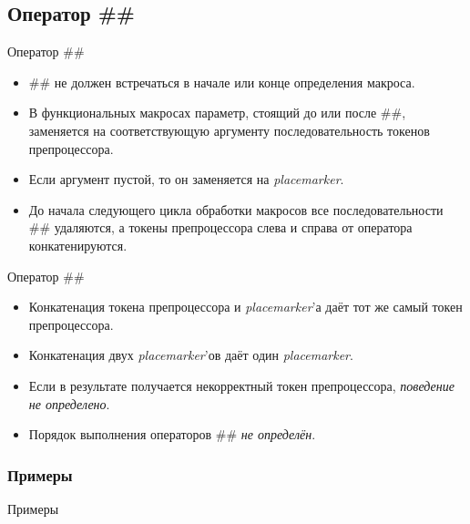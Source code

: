     \subsection{Оператор \#\#}
    \begin{frame}{Оператор \#\#}
        \begin{itemize}
            \item \#\# не должен встречаться в начале или конце определения макроса.
            \item В функциональных макросах параметр, стоящий до или после \#\#,
                заменяется на соответствующую аргументу последовательность токенов препроцессора.
            \item Если аргумент пустой, то он заменяется на \textit{placemarker}.
            \item До начала следующего цикла обработки макросов все последовательности
                \#\# удаляются, а токены препроцессора слева и справа от оператора конкатенируются.
        \end{itemize}
    \end{frame}
    \begin{frame}{Оператор \#\#}
        \begin{itemize}
            \item Конкатенация токена препроцессора и \textit{placemarker}'а даёт тот же самый токен препроцессора.
            \item Конкатенация двух \textit{placemarker}'ов даёт один \textit{placemarker}.
            \item Если в результате получается некорректный токен препроцессора, \textit{поведение не определено}.
            \item Порядок выполнения операторов \#\# \textit{не определён}.
        \end{itemize}
    \end{frame}
    \subsubsection{Примеры}
    \begin{frame}{Примеры}
        
    \end{frame}
